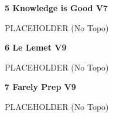 \begin{multicols}{2}
					\label{rt:Knowledge is Good} \colorbox{Goldenrod!50}{\textbf{5 Knowledge is Good V7  }}
					\begin{adjustwidth}{1cm}{}
					PLACEHOLDER
						\newline (No Topo) 
					\end{adjustwidth}
					\label{rt:Le Lemet} \colorbox{Goldenrod!50}{\textbf{6 Le Lemet V9  }}
					\begin{adjustwidth}{1cm}{}
					PLACEHOLDER
						\newline (No Topo) 
					\end{adjustwidth}
					\label{rt:Farely Prep} \colorbox{Goldenrod!50}{\textbf{7 Farely Prep V9  }}
					\begin{adjustwidth}{1cm}{}
					PLACEHOLDER
						\newline (No Topo) 
					\end{adjustwidth}
\end{multicols}
\clearpage